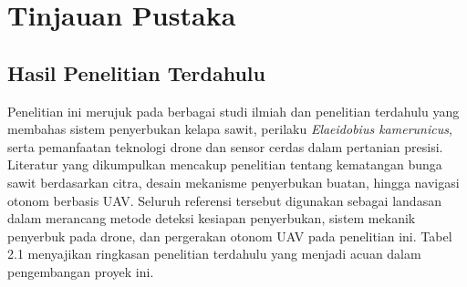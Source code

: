 \chapter{Tinjauan Pustaka}
\label{chap:tinjauan-pustaka}

\section{Hasil Penelitian Terdahulu}

Penelitian ini merujuk pada berbagai studi ilmiah dan penelitian terdahulu yang membahas sistem penyerbukan kelapa sawit, perilaku \emph{Elaeidobius kamerunicus}, serta pemanfaatan
teknologi drone dan sensor cerdas dalam pertanian presisi. Literatur yang dikumpulkan
mencakup penelitian tentang kematangan bunga sawit berdasarkan citra, desain mekanisme
penyerbukan buatan, hingga navigasi otonom berbasis UAV. Seluruh referensi tersebut
digunakan sebagai landasan dalam merancang metode deteksi kesiapan penyerbukan, sistem
mekanik penyerbuk pada drone, dan pergerakan otonom UAV pada penelitian ini. Tabel 2.1
menyajikan ringkasan penelitian terdahulu yang menjadi acuan dalam pengembangan proyek
ini.

